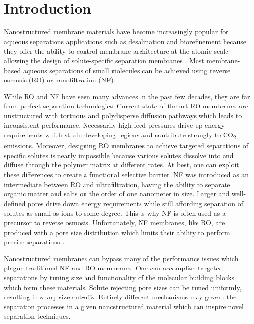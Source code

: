 \section*{Introduction}

Nanostructured membrane materials have become increasingly popular for 
aqueous separations applications such as desalination and biorefinement
because they offer the ability to control membrane architecture at the
atomic scale allowing the design of solute-specific separation membranes 
\cite{humplik_nanostructured_2011}. Most membrane-based aqueous 
separations of small molecules can be achieved using reverse osmosis 
(RO) or nanofiltration (NF)\cite{van_der_bruggen_review_2003}. 

While RO and NF have seen many advances in the past few decades, they 
are far from perfect separation technologies. Current state-of-the-art
RO membranes are unstructured with tortuous and polydisperse diffusion
pathways which leads to inconsistent performance\cite{song_nano_2011}.
Necessarily high feed pressures drive up energy requirements which 
strain developing regions and contribute strongly to CO\textsubscript{2} 
emissions\cite{mcginnis_global_2008}. Moreover, designing RO 
membranes to achieve targeted separations of specific solutes is nearly
impossible because various solutes dissolve into and diffuse through the polymer
matrix at different rates\cite{wijmans_solution-diffusion_1995}. At best,
one can exploit these differences to create a functional selective 
barrier. NF was introduced as an intermediate between RO and 
ultrafiltration, having the ability to separate organic matter and salts
on the order of one nanometer in size. Larger and well-defined pores 
drive down energy requirements while still affording separation of 
solutes as small as ions to some degree\cite{van_der_bruggen_review_2003}.
This is why NF is often used as a precursor to reverse osmosis. 
Unfortunately, NF membranes, like RO, are produced with a pore size 
distribution which limits their ability to perform precise separations
\cite{bowen_modelling_2002}.

Nanostructured membranes can bypass many of the performance issues which
plague traditional NF and RO membranes. One can accomplish targeted
separations by tuning size and functionality of the molecular building
blocks which form these materials. Solute rejecting pore sizes can be  %
tuned uniformly, resulting in sharp size cut-offs. Entirely different
mechanisms may govern the separation processes in a given nanostructured
material which can inspire novel separation techniques.

